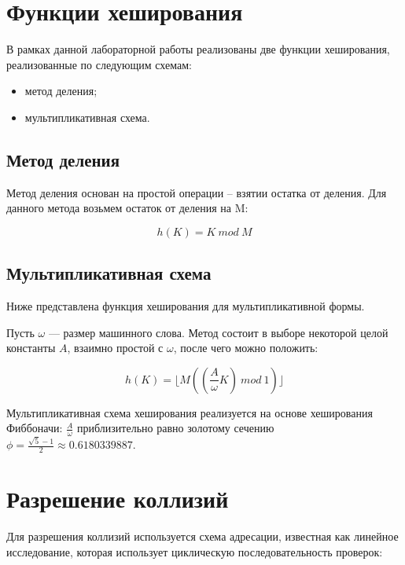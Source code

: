 \section{Функции хеширования}

В рамках данной лабораторной работы реализованы две функции хеширования, реализованные по следующим схемам:

\begin{itemize}[$\bullet$]
    \item метод деления;
    \item мультипликативная схема.
\end{itemize}

\subsection{Метод деления}

Метод деления основан на простой операции -- взятии остатка от деления. Для данного метода возьмем остаток от деления на M:

\begin{equation}
    h(K) = K~mod~M
\end{equation}

\subsection{Мультипликативная схема}

Ниже представлена функция хеширования для мультипликативной формы.

Пусть $\omega$ --- размер машинного слова. Метод состоит в выборе некоторой целой константы $A$, взаимно простой с $\omega$, после чего можно положить: 

\begin{equation}
    h(K) = \lfloor M\left(\left(\frac{A}{\omega}K\right)~mod~1\right) \rfloor
\end{equation}

Мультипликативная схема хеширования реализуется на основе хеширования Фиббоначи: $\frac{A}{\omega}$ приблизительно равно золотому сечению $\phi = \frac{\sqrt{5} - 1}{2} \approx 0.6180339887$.

\section{Разрешение коллизий}

Для разрешения коллизий используется схема адресации, известная как линейное исследование, которая использует циклическую последовательность проверок:

